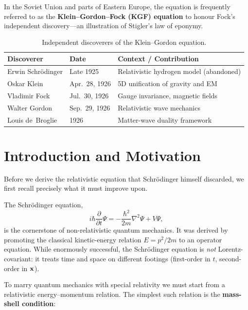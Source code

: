 \documentclass[12pt, a4paper]{article}
\theoremstyle{definition}
\begin{document}
In the Soviet Union and parts of Eastern Europe, the equation is frequently referred to as the \textbf{Klein--Gordon--Fock (KGF) equation} to honour Fock's independent discovery---an illustration of Stigler's law of eponymy.

\renewcommand{\arraystretch}{1.3}
\begin{table}[h]
\centering
\caption{Independent discoverers of the Klein--Gordon equation.}
\begin{tabular}{@{}llp{6.8cm}@{}}
\toprule
\textbf{Discoverer} & \textbf{Date} & \textbf{Context / Contribution} \\
\midrule
Erwin Schr\"{o}dinger & Late 1925 & Relativistic hydrogen model (abandoned) \\
Oskar Klein & Apr.\ 28, 1926 & 5D unification of gravity and EM \\
Vladimir Fock & Jul.\ 30, 1926 & Gauge invariance, magnetic fields \\
Walter Gordon & Sep.\ 29, 1926 & Relativistic wave mechanics \\
Louis de~Broglie & 1926 & Matter-wave duality framework \\
\bottomrule
\end{tabular}
\end{table}

\section{Introduction and Motivation}
\label{sec:intro}

Before we derive the relativistic equation that Schr\"{o}dinger himself discarded, we first recall precisely what it must improve upon.

The Schr\"{o}dinger equation,
\begin{equation}
    i\hbar\frac{\partial}{\partial t}\Psi
    = -\frac{\hbar^{2}}{2m}\nabla^{2}\Psi + V\Psi,
\end{equation}
is the cornerstone of non-relativistic quantum mechanics.  It was derived by
promoting the classical kinetic-energy relation $E = p^{2}/2m$ to an operator
equation.  While enormously successful, the Schr\"{o}dinger equation is
\emph{not} Lorentz-covariant: it treats time and space on different footings
(first-order in $t$, second-order in $\vb{x}$).

To marry quantum mechanics with special relativity we must start from a
relativistic energy--momentum relation.  The simplest such relation is the
\textbf{mass-shell condition}:
\end{document}
